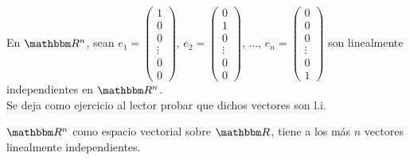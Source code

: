 \begin{example}
    En $\RR[n]$, sean $\displaystyle e_1 = \left( \begin{array}{c} 1 \\ 0 \\ 0 \\ \vdots \\ 0 \\ 0 \end{array} \right)$, $\displaystyle e_2 = \left( \begin{array}{c} 0 \\ 1 \\ 0 \\ \vdots \\ 0 \\ 0 \end{array} \right)$, $\dots$, $\displaystyle e_n = \left( \begin{array}{c} 0 \\ 0 \\ 0 \\ \vdots \\ 0 \\ 1 \end{array} \right)$ son linealmente independientes en $\RR[n]$. \\
    \solucion Se deja como ejercicio al lector probar que dichos vectores son l.i.
\end{example}

\begin{theorem}
    $\RR[n]$ como espacio vectorial sobre $\RR$, tiene a los más $n$ vectores linealmente independientes.
\end{theorem}

